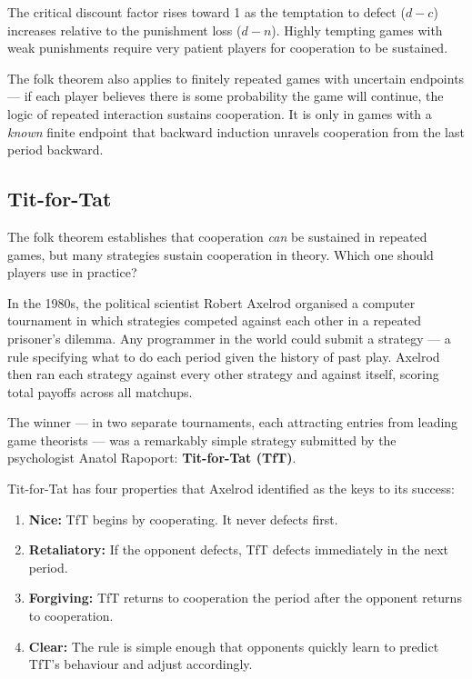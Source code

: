 \documentclass[12pt, letterpaper]{article}
\begin{document}
The critical discount factor rises toward 1 as the temptation to defect ($d - c$) increases relative to the punishment loss ($d - n$). Highly tempting games with weak punishments require very patient players for cooperation to be sustained.

The folk theorem also applies to finitely repeated games with uncertain endpoints --- if each player believes there is some probability the game will continue, the logic of repeated interaction sustains cooperation. It is only in games with a \textit{known} finite endpoint that backward induction unravels cooperation from the last period backward.


\subsection{Tit-for-Tat}


The folk theorem establishes that cooperation \textit{can} be sustained in repeated games, but many strategies sustain cooperation in theory. Which one should players use in practice?

In the 1980s, the political scientist Robert Axelrod organised a computer tournament in which strategies competed against each other in a repeated prisoner's dilemma. Any programmer in the world could submit a strategy --- a rule specifying what to do each period given the history of past play. Axelrod then ran each strategy against every other strategy and against itself, scoring total payoffs across all matchups.

The winner --- in two separate tournaments, each attracting entries from leading game theorists --- was a remarkably simple strategy submitted by the psychologist Anatol Rapoport: \textbf{Tit-for-Tat (TfT)}.

Tit-for-Tat has four properties that Axelrod identified as the keys to its success:

\begin{enumerate}
\item \textbf{Nice:} TfT begins by cooperating. It never defects first.
\item \textbf{Retaliatory:} If the opponent defects, TfT defects immediately in the next period.
\item \textbf{Forgiving:} TfT returns to cooperation the period after the opponent returns to cooperation.
\item \textbf{Clear:} The rule is simple enough that opponents quickly learn to predict TfT's behaviour and adjust accordingly.
\end{enumerate}
\end{document}
